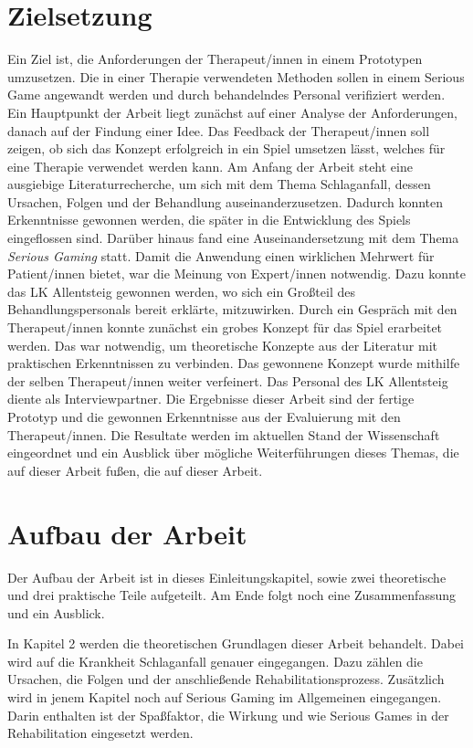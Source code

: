 \section{Zielsetzung}
Ein Ziel ist, die Anforderungen der Therapeut/innen in einem Prototypen umzusetzen. Die in einer Therapie verwendeten Methoden sollen in einem Serious Game angewandt werden und durch behandelndes Personal verifiziert werden. Ein Hauptpunkt der Arbeit liegt zunächst auf einer Analyse der Anforderungen, danach auf der Findung einer Idee. Das Feedback der Therapeut/innen soll zeigen, ob sich das Konzept erfolgreich in ein Spiel umsetzen lässt, welches für eine Therapie verwendet werden kann.
Am Anfang der Arbeit steht eine ausgiebige Literaturrecherche, um sich mit dem Thema Schlaganfall, dessen Ursachen, Folgen und der Behandlung auseinanderzusetzen. Dadurch konnten Erkenntnisse gewonnen werden, die später in die Entwicklung des Spiels eingeflossen sind. Darüber hinaus fand eine Auseinandersetzung mit dem Thema \textit{Serious Gaming} statt.
Damit die Anwendung einen wirklichen Mehrwert für Patient/innen bietet, war die Meinung von Expert/innen notwendig. Dazu konnte das LK Allentsteig gewonnen werden, wo sich ein Großteil des Behandlungspersonals bereit erklärte, mitzuwirken.
Durch ein Gespräch mit den Therapeut/innen konnte zunächst ein grobes Konzept für das Spiel erarbeitet werden. Das war notwendig, um theoretische Konzepte aus der Literatur mit praktischen Erkenntnissen zu verbinden. Das gewonnene Konzept wurde mithilfe der selben Therapeut/innen weiter verfeinert. Das Personal des LK Allentsteig diente als Interviewpartner.
Die Ergebnisse dieser Arbeit sind der fertige Prototyp und die gewonnen Erkenntnisse aus der Evaluierung mit den Therapeut/innen. Die Resultate werden im aktuellen Stand der Wissenschaft eingeordnet und ein Ausblick über mögliche Weiterführungen dieses Themas, die auf dieser Arbeit fußen, die auf dieser Arbeit.

\section{Aufbau der Arbeit}
Der Aufbau der Arbeit ist in dieses Einleitungskapitel, sowie zwei theoretische und drei praktische Teile aufgeteilt. Am Ende folgt noch eine Zusammenfassung und ein Ausblick.

In Kapitel 2 werden die theoretischen Grundlagen dieser Arbeit behandelt. Dabei wird auf die Krankheit Schlaganfall genauer eingegangen. Dazu zählen die Ursachen, die Folgen und der anschließende Rehabilitationsprozess. Zusätzlich wird in jenem Kapitel noch auf Serious Gaming im Allgemeinen eingegangen. Darin enthalten ist der Spaßfaktor, die Wirkung und wie Serious Games in der Rehabilitation eingesetzt werden.

